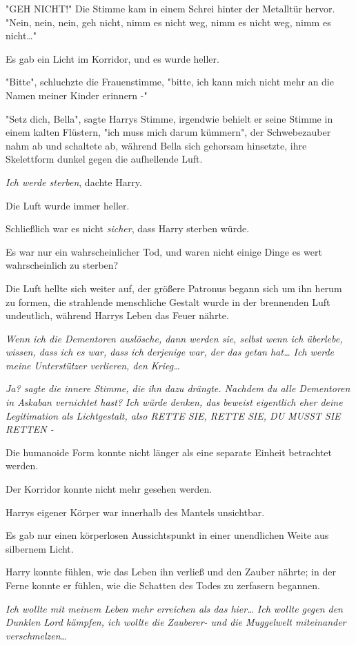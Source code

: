 {"GEH NICHT!" Die Stimme kam in einem Schrei hinter der Metalltür hervor. "Nein, nein, nein, geh nicht, nimm es nicht weg, nimm es nicht weg, nimm es nicht…"

Es gab ein Licht im Korridor, und es wurde heller.

"Bitte", schluchzte die Frauenstimme, "bitte, ich kann mich nicht mehr an die Namen meiner Kinder erinnern -"

"Setz dich, Bella", sagte Harrys Stimme, irgendwie behielt er seine Stimme in einem kalten Flüstern, "ich muss mich darum kümmern", der Schwebezauber nahm ab und schaltete ab, während Bella sich gehorsam hinsetzte, ihre Skelettform dunkel gegen die aufhellende Luft.

\emph{Ich werde sterben}, dachte Harry.

Die Luft wurde immer heller.

Schließlich war es nicht \emph{sicher}, dass Harry sterben würde.

Es war nur ein wahrscheinlicher Tod, und waren nicht einige Dinge es wert wahrscheinlich zu sterben?

Die Luft hellte sich weiter auf, der größere Patronus begann sich um ihn herum zu formen, die strahlende menschliche Gestalt wurde in der brennenden Luft undeutlich, während Harrys Leben das Feuer nährte.

\emph{\emph{Wenn ich die Dementoren auslösche, dann werden sie, selbst wenn ich überlebe, wissen, dass ich es war, dass ich derjenige war, der das getan hat… Ich werde meine Unterstützer verlieren, den Krieg…}}

\emph{\emph{Ja?} sagte die innere Stimme, die ihn dazu drängte. \emph{Nachdem du alle Dementoren in Askaban vernichtet hast? Ich würde denken, das beweist eigentlich eher deine Legitimation als Lichtgestalt, also RETTE SIE, RETTE SIE, DU MUSST SIE RETTEN -}}

Die humanoide Form konnte nicht länger als eine separate Einheit betrachtet werden.

Der Korridor konnte nicht mehr gesehen werden.

Harrys eigener Körper war innerhalb des Mantels unsichtbar.

Es gab nur einen körperlosen Aussichtspunkt in einer unendlichen Weite aus silbernem Licht.

Harry konnte fühlen, wie das Leben ihn verließ und den Zauber nährte; in der Ferne konnte er fühlen, wie die Schatten des Todes zu zerfasern begannen.

\emph{\emph{Ich wollte mit meinem Leben mehr erreichen als das hier… Ich wollte gegen den Dunklen Lord kämpfen, ich wollte die Zauberer- und die Muggelwelt miteinander verschmelzen…}}

}
